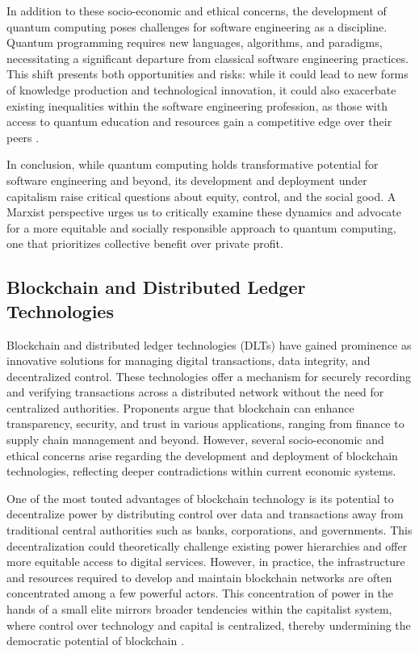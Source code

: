 \begin{refsection}
In addition to these socio-economic and ethical concerns, the development of quantum computing poses challenges for software engineering as a discipline. Quantum programming requires new languages, algorithms, and paradigms, necessitating a significant departure from classical software engineering practices. This shift presents both opportunities and risks: while it could lead to new forms of knowledge production and technological innovation, it could also exacerbate existing inequalities within the software engineering profession, as those with access to quantum education and resources gain a competitive edge over their peers \cite[pp.~184-187]{braverman1998labor}.

In conclusion, while quantum computing holds transformative potential for software engineering and beyond, its development and deployment under capitalism raise critical questions about equity, control, and the social good. A Marxist perspective urges us to critically examine these dynamics and advocate for a more equitable and socially responsible approach to quantum computing, one that prioritizes collective benefit over private profit.

\subsection{Blockchain and Distributed Ledger Technologies}

Blockchain and distributed ledger technologies (DLTs) have gained prominence as innovative solutions for managing digital transactions, data integrity, and decentralized control. These technologies offer a mechanism for securely recording and verifying transactions across a distributed network without the need for centralized authorities. Proponents argue that blockchain can enhance transparency, security, and trust in various applications, ranging from finance to supply chain management and beyond. However, several socio-economic and ethical concerns arise regarding the development and deployment of blockchain technologies, reflecting deeper contradictions within current economic systems.

One of the most touted advantages of blockchain technology is its potential to decentralize power by distributing control over data and transactions away from traditional central authorities such as banks, corporations, and governments. This decentralization could theoretically challenge existing power hierarchies and offer more equitable access to digital services. However, in practice, the infrastructure and resources required to develop and maintain blockchain networks are often concentrated among a few powerful actors. This concentration of power in the hands of a small elite mirrors broader tendencies within the capitalist system, where control over technology and capital is centralized, thereby undermining the democratic potential of blockchain \cite[pp.~123-126]{dean2018communist}.


\end{refsection}

